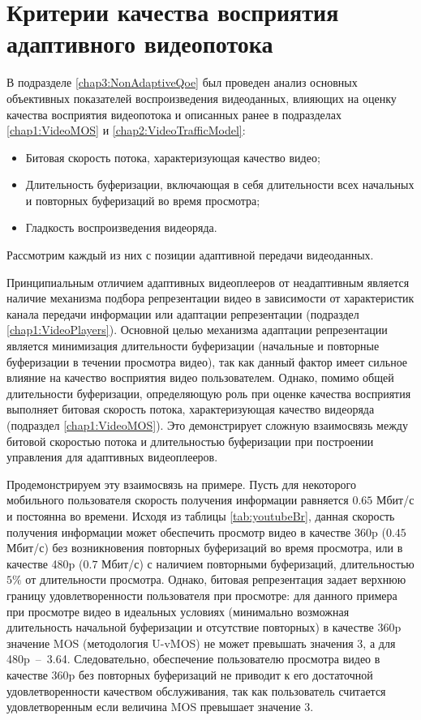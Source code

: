 
\section{Критерии качества восприятия адаптивного видеопотока}
\label{chap4:AdaptiveQoe}

В подразделе \ref{chap3:NonAdaptiveQoe} был проведен анализ основных объективных показателей воспроизведения видеоданных, влияющих на оценку качества восприятия видеопотока и описанных ранее в подразделах \ref{chap1:VideoMOS} и \ref{chap2:VideoTrafficModel}:
\begin{itemize}
	\item Битовая скорость потока, характеризующая качество видео;
	\item Длительность буферизации, включающая в себя длительности всех начальных и повторных буферизаций во время просмотра;
	\item Гладкость воспроизведения видеоряда.
\end{itemize}
Рассмотрим каждый из них с позиции адаптивной передачи видеоданных.

Принципиальным отличием адаптивных видеоплееров от неадаптивным является наличие механизма подбора репрезентации видео в зависимости от характеристик канала передачи информации или адаптации репрезентации (подраздел \ref{chap1:VideoPlayers}). Основной целью механизма адаптации репрезентации является минимизация длительности буферизации (начальные и повторные буферизации в течении просмотра видео), так как данный фактор имеет сильное влияние на качество восприятия видео пользователем. Однако, помимо общей длительности буферизации, определяющую роль при оценке качества восприятия выполняет битовая скорость потока, характеризующая качество видеоряда (подраздел \ref{chap1:VideoMOS}). Это демонстрирует сложную взаимосвязь между битовой скоростью потока и длительностью буферизации при построении управления для адаптивных видеоплееров.

Продемонстрируем эту взаимосвязь на примере. Пусть для некоторого мобильного пользователя скорость получения информации равняется $0.65$ Мбит/с и постоянна во времени. Исходя из таблицы \ref{tab:youtubeBr}, данная скорость получения информации может обеспечить просмотр видео в качестве 360p ($0.45$ Мбит/с) без возникновения повторных буферизаций во время просмотра, или в качестве 480p ($0.7$ Мбит/с) с наличием повторными буферизаций, длительностью $5\%$ от длительности просмотра. Однако, битовая репрезентация задает верхнюю границу удовлетворенности пользователя при просмотре: для данного примера при просмотре видео в идеальных условиях (минимально возможная длительность начальной буферизации и отсутствие повторных) в качестве 360p значение MOS (методология U-vMOS) не может превышать значения 3, а для 480p~--~3.64. Следовательно, обеспечение пользователю просмотра видео в качестве 360p без повторных буферизаций не приводит к его достаточной удовлетворенности качеством обслуживания, так как пользователь считается удовлетворенным если величина MOS превышает значение 3.

